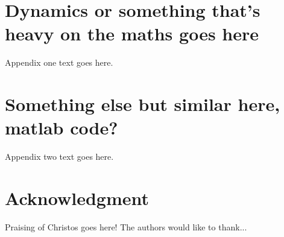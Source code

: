 \documentclass[journal]{IEEEtran}
\begin{document}
\appendices
\section{Dynamics or something that's heavy on the maths goes here}
Appendix one text goes here.

\section{Something else but similar here, matlab code?}
Appendix two text goes here.


\section*{Acknowledgment}

Praising of Christos goes here!
The authors would like to thank...


\ifCLASSOPTIONcaptionsoff
  \newpage
\fi





%
%
%








\end{document}
